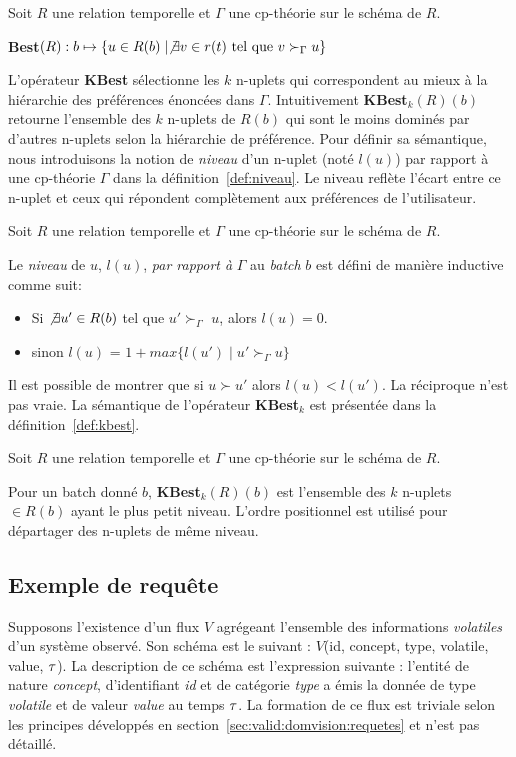 \begin{defi}[Best]\label{def:best}
Soit $R$ une relation temporelle et $\Gamma$ une cp-th\'eorie sur le schéma de $R$. 

\textbf{Best}$(R): b\mapsto \{u \in R(b) \mid \not\exists v \in r(t) \textrm{ tel que } v \succ_\Gamma u \}$
\end{defi}

L'opérateur \textbf{KBest} sélectionne les $k$ n-uplets qui correspondent au mieux à la hiérarchie des préférences énoncées dans $\Gamma$. Intuitivement \textbf{KBest}$_k(R)(b)$ retourne l'ensemble des $k$ n-uplets de $R(b)$ qui sont le moins dominés par d'autres n-uplets selon la hiérarchie de préférence. Pour définir sa sémantique, nous introduisons la notion de \textit{niveau} d'un n-uplet (noté $l(u)$) par rapport à une cp-théorie $\Gamma$ dans la définition~\ref{def:niveau}. Le niveau reflète l'écart entre ce n-uplet et ceux qui répondent complètement aux préférences de l'utilisateur.

\begin{defi}[Niveau]\label{def:niveau}
Soit $R$ une relation temporelle et $\Gamma$ une cp-th\'eorie sur le schéma de $R$.

Le \textit{niveau} de $u$, $l(u)$, \textit{par rapport à} $\Gamma$ au \textit{batch} $b$ est défini de manière inductive comme suit:
 \begin{itemize}
 \item Si $\not\exists u' \in R(b)$ tel que $u' \succ_\Gamma$ $u$, alors $l(u) = 0$.
 \item sinon $l(u)$ = $1+max \{l(u') \mid u' \succ_\Gamma u\} $
 \end{itemize}
\end{defi}

Il est possible de montrer que si $u \succ u'$ alors $l(u) < l(u')$. La réciproque n'est pas vraie. La sémantique de l'opérateur \textbf{KBest}$_k$ est présentée dans la définition~\ref{def:kbest}.

\begin{defi}[KBest]\label{def:kbest}
Soit $R$ une relation temporelle et $\Gamma$ une cp-th\'eorie sur le schéma de $R$. 

Pour un batch donné $b$, \textbf{KBest}$_k(R)(b)$ est l'ensemble des $k$ n-uplets $\in R(b)$ ayant le plus petit niveau. L'ordre positionnel est utilisé pour départager des n-uplets de même niveau.
\end{defi}

\subsection{Exemple de requête}
Supposons l'existence d'un flux $V$ agrégeant l'ensemble des informations \textit{volatiles} d'un système observé. Son schéma est le suivant : $V$(id, concept, type, volatile, value, $\tau$). La description de ce schéma est l'expression suivante : l'entité de nature \textit{concept}, d'identifiant \textit{id} et de catégorie \textit{type} a émis la donnée de type \textit{volatile} et de valeur \textit{value} au temps $\tau$. La formation de ce flux est triviale selon les principes développés en section~\ref{sec:valid:domvision:requetes} et n'est pas détaillé.

